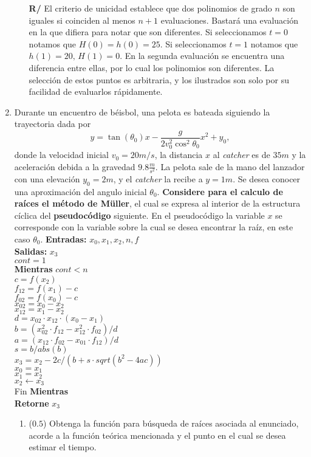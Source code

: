 \documentclass[12pt]{article}
\begin{document}
\begin{enumerate}[leftmargin=*,widest=9]
\begin{enumerate}[label=\alph*]
\textbf{R/} El criterio de unicidad establece que dos polinomios de grado \(n\) son iguales si coinciden al menos \(n+1\) evaluaciones. Bastará una evaluación en la que difiera para notar que son diferentes.
Si seleccionamos \(t=0\) notamos que \(H(0) = h(0) = 25\). Si seleccionamos \(t=1\) notamos que \(h(1)= 20,\,H(1)=0\). En la segunda evaluación se encuentra una diferencia entre ellas, por lo cual los polinomios son diferentes. La selección de estos puntos es arbitraria, y los ilustrados son solo por su facilidad de evaluarlos rápidamente.
\end{enumerate}
   \item {\small Durante un encuentro de béisbol, una pelota es bateada siguiendo la trayectoria dada por \[y=\tan(\theta_{0})x-\frac{g}{2v_{0}^{2}\cos^{2}\theta_{0}}x^{2}+y_{0},\] donde la velocidad inicial $v_{0}= 20 m/s$, la distancia $x$ al \textit{catcher} es de $35 m$ y la aceleración debida a la gravedad \(9.8 \frac{m}{s^2}\). La pelota sale de la mano del lanzador con una elevación $y_{0} = 2 m$, y el \textit{catcher} la recibe a \(y=1 m\). Se desea conocer una aproximación del angulo inicial \(\theta_0\). \textbf{Considere para el calculo de raíces el método de Müller}, el cual se expresa al interior de la estructura cíclica del \textbf{pseudocódigo} siguiente. En el pseudocódigo la variable \(x\) se corresponde con la variable sobre la cual se desea encontrar la raíz, en este caso \(\theta_0\).}
{\scriptsize
\textbf{Entradas:} \(x_0, x_1, x_2, n, f \) \\
\textbf{Salidas:} \(x_3 \) \\
\(cont = 1 \) \\
\textbf{Mientras} \(cont < n \) \\
\(c = f(x_2) \) \\
\(f_{12} = f(x_1) - c\) \\
\(f_{02} = f(x_0) - c\) \\
\(x_{02} = x_0 - x_2\) \\
\(x_{12} = x_1 - x_2\) \\
\(d = x_{02} \cdot x_{12} \cdot (x_0 - x_1)\) \\
\(b = (x_{02}^2 \cdot f_{12} - x_{12}^2 \cdot f_{02}) / d\) \\
\(a = (x_{12} \cdot f_{02} - x_{01} \cdot f_{12}) / d\) \\
\(s = b / abs(b)\) \\
\(x_3 = x_2 - 2 c / (b + s \cdot sqrt(b^2 - 4 a c))\) \\
\(x_0 = x_1\) \\
\(x_1 = x_2\) \\
\(x_2 \leftarrow x_3\) \\
Fin \textbf{Mientras}\\
\textbf{Retorne} \(x_3\) \\
}
\vspace{-.8cm}
\begin{enumerate}[label=\alph*]
\item (\(0.5\)) Obtenga la función para búsqueda de raíces asociada al enunciado, acorde a la función teórica mencionada y el punto en el cual se desea estimar el tiempo.


\end{enumerate}
\end{enumerate}
\end{document}
